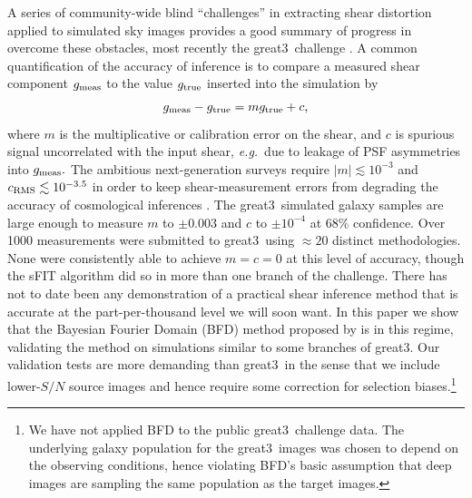 \documentclass[11pt,preprint,flushrt]{aastex}
\newcommand\eg{{\it e.g.\/}}
\newcommand{\great}{{\sc great3}}
\newcommand\edit[1]{#1}
\begin{document}
A series of community-wide blind ``challenges''  in extracting shear
distortion applied to simulated sky images provides a good summary of
progress in overcome these obstacles, most recently the \great\
challenge \citep{great3}.  A common quantification of the
accuracy of inference is to compare a measured shear component $g_{\rm
  meas}$ to the value $g_{\rm true}$ inserted into the simulation by
\begin{equation}
g_{\rm meas} - g_{\rm true} = m g_{\rm true} + c,
\end{equation}
where $m$ is the multiplicative or calibration error on the shear, and
$c$ is spurious signal uncorrelated with the input shear, \eg\ due to
leakage of PSF asymmetries into $g_{\rm meas}.$  The ambitious
next-generation surveys require $|m| \lesssim 10^{-3}$ and $c_{\rm
  RMS} \lesssim 10^{-3.5}$ in order to keep shear-measurement errors
from degrading the accuracy of cosmological inferences
\citep{htbj,amararefregier}. The \great\ simulated galaxy samples are large
enough to measure $m$ to $\pm0.003$ and $c$ to $\pm10^{-4}$ at 68\%
confidence. Over 1000 measurements were submitted to \great\ using
$\approx20$ distinct methodologies.  None were consistently able to
achieve $m=c=0$ at this level of accuracy, though the {\sc
  sFIT} \edit{algorithm \citep[see][]{great3}} did so in more than one branch of the
challenge.  There has not to date been any demonstration of a
practical shear inference method that is accurate at the
part-per-thousand level we will soon want.  In this paper we show that the
Bayesian Fourier Domain (BFD) method proposed by \citet[BA14]{BA14}
is in this regime, validating the method on simulations similar to some
branches of \great.  Our validation tests are more demanding than
\great\ in the
sense that we include lower-$S/N$
source images and hence require some correction for selection
biases.\footnote{\edit{We have not applied BFD to the public \great\
  challenge data.  The underlying galaxy population for the \great\
  images was chosen to depend on the observing conditions, hence
  violating BFD's basic assumption that deep images are sampling the
  same population as the target images.}}
\end{document}
